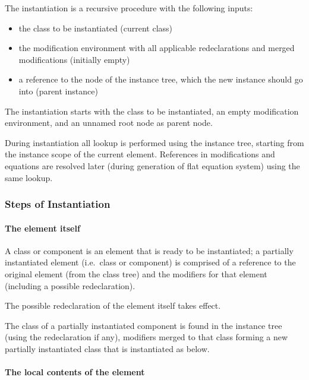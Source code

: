 The instantiation is a recursive procedure with the following inputs:
\begin{itemize}
\item
  the class to be instantiated (current class)
\item
  the modification environment with all applicable redeclarations and
  merged modifications (initially empty)
\item
  a reference to the node of the instance tree, which the new instance
  should go into (parent instance)
\end{itemize}

The instantiation starts with the class to be instantiated, an empty
modification environment, and an unnamed root node as parent node.

During instantiation all lookup is performed using the instance tree,
starting from the instance scope of the current element. References in
modifications and equations are resolved later (during generation of
flat equation system) using the same lookup.

\subsubsection{Steps of Instantiation}\label{steps-of-instantiation}

\paragraph*{The element itself}\label{the-element-itself}

A  class or component is an element that is ready to be instantiated; a partially instantiated element (i.e.\ class or component) is comprised of a reference to the original element (from the class tree) and the modifiers for that element (including a possible redeclaration).

The possible redeclaration of the element itself takes effect.

The class of a partially instantiated component is found in the instance
tree (using the redeclaration if any), modifiers merged to that class
forming a new partially instantiated class that is instantiated as
below.

\paragraph*{The local contents of the element}\label{the-local-contents-of-the-element}

